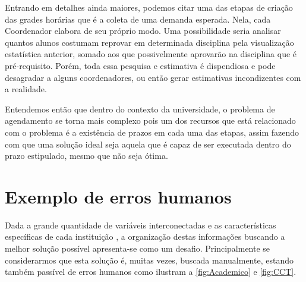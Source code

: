 
Entrando em detalhes ainda maiores, podemos citar uma das etapas de criação das grades horárias que é a coleta de uma demanda esperada. Nela, cada Coordenador elabora de seu próprio modo. Uma possibilidade seria analisar quantos alunos costumam reprovar em determinada disciplina pela visualização estatística anterior, somado aos que possivelmente aprovarão na disciplina que é pré-requisito. Porém, toda essa pesquisa e estimativa é dispendiosa e pode desagradar a alguns coordenadores, ou então gerar estimativas incondizentes com a realidade.

Entendemos então que dentro do contexto da universidade, o problema de agendamento se torna mais complexo pois um dos recursos que está relacionado com o problema é a existência de prazos em cada uma das etapas, assim fazendo com que uma solução ideal seja aquela que é capaz de ser executada dentro do prazo estipulado, mesmo que não seja ótima.

\section{Exemplo de erros humanos} %

Dada a grande quantidade de variáveis interconectadas e as características específicas de cada instituição \cite{miranda_udpskeduler_2012}, a organização destas informações buscando a melhor solução possível apresenta-se como um desafio. Principalmente se considerarmos que esta solução é, muitas vezes, buscada manualmente, estando também passível de erros humanos como ilustram a \autoref{fig:Academico} e \autoref{fig:CCT}.

